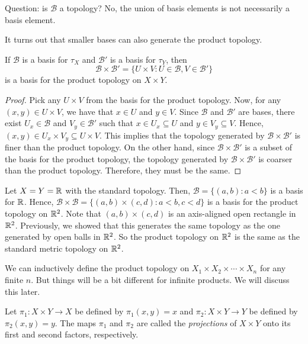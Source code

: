 Question: is $\mathcal{B}$ a topology? No, the union of basis elements is not necessarily a basis element.

It turns out that smaller bases can also generate the product topology.

\begin{theorem}
  If $\mathcal{B}$ is a basis for ${\tau}_X$ and $\mathcal{B}'$ is a basis for ${\tau}_Y$, then
  \[
    \mathcal{B} \times \mathcal{B}' = \{ U \times V : U \in \mathcal{B}, V \in \mathcal{B}' \}
  \]
  is a basis for the product topology on $X \times Y$.
\end{theorem}
\begin{proof}
  Pick any $U\times V$ from the basis for the product topology. Now, for any $(x,y)\in U\times V$, we have that $x\in U$ and $y\in V$. Since $\mathcal{B}$ and $\mathcal{B}'$ are bases, there exist $U_x\in\mathcal{B}$ and $V_y\in\mathcal{B}'$ such that $x\in U_x\subseteq U$ and $y\in V_y\subseteq V$. Hence, $(x,y)\in U_x\times V_y \subseteq U\times V$. This implies that the topology generated by $\mathcal{B}\times\mathcal{B}'$ is finer than the product topology. On the other hand, since $\mathcal{B}\times\mathcal{B}'$ is a subset of the basis for the product topology, the topology generated by $\mathcal{B}\times\mathcal{B}'$ is coarser than the product topology. Therefore, they must be the same. 
\end{proof}

\begin{example}
  Let $X=Y=\mathbb{R}$ with the standard topology. Then, $\mathcal{B}=\{(a,b): a<b\}$ is a basis for $\mathbb{R}$. Hence, $\mathcal{B}\times\mathcal{B}=\{(a,b)\times(c,d): a<b, c<d\}$ is a basis for the product topology on $\mathbb{R}^2$. Note that $(a,b)\times(c,d)$ is an axis-aligned open rectangle in $\mathbb{R}^2$. Previously, we showed that this generates the same topology as the one generated by open balls in $\mathbb{R}^2$. So the product topology on $\mathbb{R}^2$ is the same as the standard metric topology on $\mathbb{R}^2$.
\end{example}

We can inductively define the product topology on $X_1\times X_2\times \cdots \times X_n$ for any finite $n$. But things will be a bit different for infinite products. We will discuss this later.

\begin{definition}
  Let $\pi_1:X\times Y\to X$ be defined by $\pi_1(x,y)=x$ and $\pi_2:X\times Y\to Y$ be defined by $\pi_2(x,y)=y$. The maps $\pi_1$ and $\pi_2$ are called the \emph{projections} of $X\times Y$ onto its first and second factors, respectively.
\end{definition}

